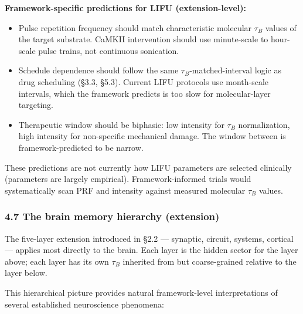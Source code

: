 \documentclass[
]{article}
\providecommand{\tightlist}{%
  \setlength{\itemsep}{0pt}\setlength{\parskip}{0pt}}
\begin{document}
\textbf{Framework-specific predictions for LIFU (extension-level):}

\begin{itemize}
\tightlist
\item
  Pulse repetition frequency should match characteristic molecular
  \(\tau_B\) values of the target substrate. CaMKII intervention should
  use minute-scale to hour-scale pulse trains, not continuous
  sonication.
\item
  Schedule dependence should follow the same \(\tau_B\)-matched-interval
  logic as drug scheduling (§3.3, §5.3). Current LIFU protocols use
  month-scale intervals, which the framework predicts is too slow for
  molecular-layer targeting.
\item
  Therapeutic window should be biphasic: low intensity for \(\tau_B\)
  normalization, high intensity for non-specific mechanical damage. The
  window between is framework-predicted to be narrow.
\end{itemize}

These predictions are not currently how LIFU parameters are selected
clinically (parameters are largely empirical). Framework-informed trials
would systematically scan PRF and intensity against measured molecular
\(\tau_B\) values.

\hypertarget{the-brain-memory-hierarchy-extension}{%
\subsubsection{4.7 The brain memory hierarchy
(extension)}\label{the-brain-memory-hierarchy-extension}}

The five-layer extension introduced in §2.2 --- synaptic, circuit,
systems, cortical --- applies most directly to the brain. Each layer is
the hidden sector for the layer above; each layer has its own \(\tau_B\)
inherited from but coarse-grained relative to the layer below.

This hierarchical picture provides natural framework-level
interpretations of several established neuroscience phenomena:
\end{document}
